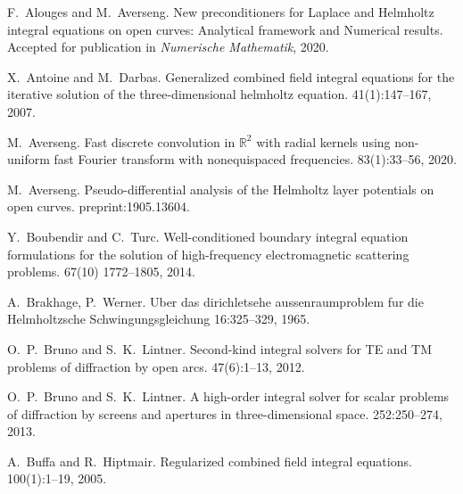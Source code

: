 \documentclass[]{article}
\begin{document}
\begin{small}
	\begin{thebibliography}{0}
		
		F.~Alouges and M.~Averseng.
		\newblock New preconditioners for Laplace and Helmholtz integral equations on open curves: Analytical framework and Numerical results. 
		\newblock Accepted for publication in {\em Numerische Mathematik}, 2020.
		
		X.~Antoine and M.~Darbas.
		\newblock Generalized combined field integral equations for the iterative
		solution of the three-dimensional helmholtz equation.
		41(1):147--167, 2007.
		
		M.~Averseng.
		\newblock Fast discrete convolution in $\mathbb {R}^{2} $ with radial kernels using non-uniform fast Fourier transform with nonequispaced frequencies. 
		 83(1):33--56, 2020.
		
		M.~Averseng. 
		\newblock Pseudo-differential analysis of the Helmholtz layer potentials on open curves. 
		 preprint:1905.13604.
		
		Y.~Boubendir and C.~Turc.
		\newblock Well-conditioned boundary integral equation formulations for the solution of high-frequency electromagnetic scattering problems.
		 67(10) 1772--1805, 2014.
		
		A.~Brakhage, P.~Werner.
		\newblock Uber das dirichletsehe aussenraumproblem fur die Helmholtzsche Schwingungsgleichung
		 16:325–329, 1965.
		
		O.~P.~Bruno and S.~K.~Lintner.
		\newblock Second-kind integral solvers for TE and TM problems of diffraction by open arcs.
		 47(6):1--13, 2012.
		
		O.~P.~Bruno and S.~K.~Lintner.
		A high-order integral solver for scalar problems of diffraction by screens and apertures in three-dimensional space.
		 252:250--274, 2013.
		
		A.~Buffa and R.~Hiptmair.
		\newblock Regularized combined field integral equations.
		 100(1):1--19, 2005.	
		

\end{thebibliography}
\end{small}
\end{document}
